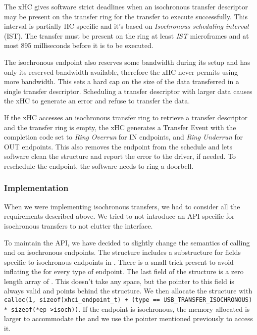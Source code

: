 The xHC gives software strict deadlines when an isochronous transfer descriptor
may be present on the transfer ring for the transfer to execute successfully.
This interval is partially HC specific and it's based on \textit{Isochronous
scheduling interval} (IST). The transfer must be present on the ring at least
\textit{IST} microframes and at most 895 milliseconds before it is to be
executed.

The isochronous endpoint also reserves some bandwidth during its setup and has
only its reserved bandwidth available, therefore the xHC never permits using
more bandwidth. This sets a hard cap on the size of the data transferred in a
single transfer descriptor. Scheduling a transfer descriptor with larger data
causes the xHC to generate an error and refuse to transfer the data.

If the xHC accesses an isochronous transfer ring to retrieve a transfer
descriptor and the transfer ring is empty, the xHC generates a Transfer Event
with the completion code set to \textit{Ring Overrun} for IN endpoints, and
\textit{Ring Underrun} for OUT endpoints. This also removes the endpoint from
the schedule and lets software clean the structure and report the error to the
driver, if needed. To reschedule the endpoint, the software needs to ring a
doorbell.

\subsubsection{Implementation}

When we were implementing isochronous transfers, we had to consider all the
requirements described above. We tried to not introduce an API specific for
isochronous transfers to not clutter the interface.

To maintain the  API, we have decided to slightly change the
semantics of calling  and  on isochronous
endpoints. The  structure includes a substructure for
fields specific to isochronous endpoints in . There is a
small trick present to avoid inflating the  for every
type of endpoint. The last field of the structure is a zero length array of
. This doesn't take any space, but the pointer to this
field is always valid and points behind the structure. We then allocate the
structure with \texttt{calloc(1, sizeof(xhci\_endpoint\_t) + (type ==
USB\_TRANSFER\_ISOCHRONOUS) * sizeof(*ep->isoch))}. If the endpoint is
isochronous, the memory allocated is larger to accommodate the
 and we use the pointer mentioned previously to access it.


